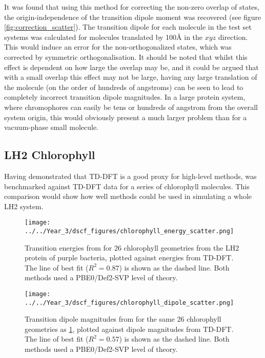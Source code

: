It was found that using this method for correcting the non-zero overlap of states, 
the origin-independence of the transition dipole moment was recovered (see figure
\ref{fig:correction_scatter}).
The transition dipole for each molecule in the test set systems was calculated
for molecules translated by 100\AA{} in the $xyz$ direction.
This would induce an error for the non-orthogonalized states, which was corrected 
by symmetric orthogonalisation. It should be noted that whilst this effect is dependent
on how large the overlap may be, and it could be argued that with a small overlap 
this effect may not be large, having any large translation of the molecule (on the order of hundreds of angstroms) 
can be seen to lead to completely incorrect transition dipole magnitudes. In a
large protein system, where chromophores can easily be tens or hundreds of angstrom
from the overall system origin, this would obviously present a much larger problem 
than for a vacuum-phase small molecule.

\subsection{LH2 Chlorophyll}
\label{subsec:dscf_chl_tests}
Having demonstrated that TD-DFT is a good proxy for high-level methods, \dscf was
benchmarked against TD-DFT data for a series of chlorophyll molecules. This comparison 
would show how well \dscf methods could be used in simulating a whole LH2 system.

\begin{figure}
\centering
\texttt{[image: ../../Year\_3/dscf\_figures/chlorophyll\_energy\_scatter.png]}
\caption{Transition energies from \dscf for 26 chlorophyll geometries from the LH2
protein of purple bacteria,  plotted against energies from TD-DFT. The line of
best fit ($R^2=0.87$) is shown as the dashed line. Both methods used a PBE0/Def2-SVP 
level of theory.}
\label{fig:chl_energy}
\end{figure}

\begin{figure}
\centering
\texttt{[image: ../../Year\_3/dscf\_figures/chlorophyll\_dipole\_scatter.png]}
\caption{Transition dipole magnitudes from \dscf for the same 26 chlorophyll geometries as
\ref{fig:chl_energy}, plotted against dipole magnitudes from TD-DFT. The line of
best fit ($R^2= 0.57$) is shown as the dashed line. Both methods used a PBE0/Def2-SVP
level of theory.}
\label{fig:chl_dipole}
\end{figure}

